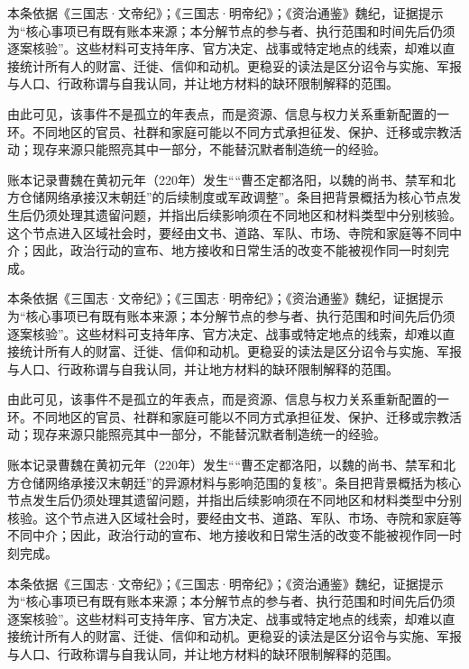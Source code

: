 本条依据《三国志·文帝纪》；《三国志·明帝纪》；《资治通鉴》魏纪，证据提示为“核心事项已有既有账本来源；本分解节点的参与者、执行范围和时间先后仍须逐案核验”。这些材料可支持年序、官方决定、战事或特定地点的线索，却难以直接统计所有人的财富、迁徙、信仰和动机。更稳妥的读法是区分诏令与实施、军报与人口、行政称谓与自我认同，并让地方材料的缺环限制解释的范围。

由此可见，该事件不是孤立的年表点，而是资源、信息与权力关系重新配置的一环。不同地区的官员、社群和家庭可能以不同方式承担征发、保护、迁移或宗教活动；现存来源只能照亮其中一部分，不能替沉默者制造统一的经验。

账本记录曹魏在黄初元年（220年）发生““曹丕定都洛阳，以魏的尚书、禁军和北方仓储网络承接汉末朝廷”的后续制度或军政调整”。条目把背景概括为核心节点发生后仍须处理其遗留问题，并指出后续影响须在不同地区和材料类型中分别核验。这个节点进入区域社会时，要经由文书、道路、军队、市场、寺院和家庭等不同中介；因此，政治行动的宣布、地方接收和日常生活的改变不能被视作同一时刻完成。

本条依据《三国志·文帝纪》；《三国志·明帝纪》；《资治通鉴》魏纪，证据提示为“核心事项已有既有账本来源；本分解节点的参与者、执行范围和时间先后仍须逐案核验”。这些材料可支持年序、官方决定、战事或特定地点的线索，却难以直接统计所有人的财富、迁徙、信仰和动机。更稳妥的读法是区分诏令与实施、军报与人口、行政称谓与自我认同，并让地方材料的缺环限制解释的范围。

由此可见，该事件不是孤立的年表点，而是资源、信息与权力关系重新配置的一环。不同地区的官员、社群和家庭可能以不同方式承担征发、保护、迁移或宗教活动；现存来源只能照亮其中一部分，不能替沉默者制造统一的经验。

账本记录曹魏在黄初元年（220年）发生““曹丕定都洛阳，以魏的尚书、禁军和北方仓储网络承接汉末朝廷”的异源材料与影响范围的复核”。条目把背景概括为核心节点发生后仍须处理其遗留问题，并指出后续影响须在不同地区和材料类型中分别核验。这个节点进入区域社会时，要经由文书、道路、军队、市场、寺院和家庭等不同中介；因此，政治行动的宣布、地方接收和日常生活的改变不能被视作同一时刻完成。

本条依据《三国志·文帝纪》；《三国志·明帝纪》；《资治通鉴》魏纪，证据提示为“核心事项已有既有账本来源；本分解节点的参与者、执行范围和时间先后仍须逐案核验”。这些材料可支持年序、官方决定、战事或特定地点的线索，却难以直接统计所有人的财富、迁徙、信仰和动机。更稳妥的读法是区分诏令与实施、军报与人口、行政称谓与自我认同，并让地方材料的缺环限制解释的范围。

